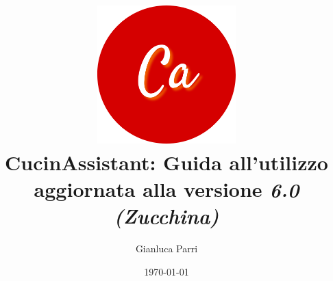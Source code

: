 \documentclass[12pt, a4paper]{report}
\begin{document}
    \title{
        \includegraphics[width=0.4\textwidth]{assets/logo.png}\\
        [1cm]CucinAssistant: Guida all'utilizzo\\
        \large aggiornata alla versione \emph{6.0 (Zucchina)}
    }
    \author{Gianluca Parri}
    \date{\today}
    \maketitle
\end{document}
